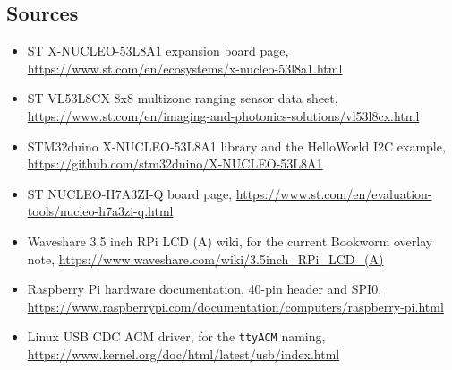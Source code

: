\subsection*{Sources}

\begin{itemize}
\item ST X-NUCLEO-53L8A1 expansion board page,
\url{https://www.st.com/en/ecosystems/x-nucleo-53l8a1.html}
\item ST VL53L8CX 8x8 multizone ranging sensor data sheet,
\url{https://www.st.com/en/imaging-and-photonics-solutions/vl53l8cx.html}
\item STM32duino X-NUCLEO-53L8A1 library and the HelloWorld I2C example,
\url{https://github.com/stm32duino/X-NUCLEO-53L8A1}
\item ST NUCLEO-H7A3ZI-Q board page,
\url{https://www.st.com/en/evaluation-tools/nucleo-h7a3zi-q.html}
\item Waveshare 3.5 inch RPi LCD (A) wiki, for the current Bookworm overlay note,
\url{https://www.waveshare.com/wiki/3.5inch_RPi_LCD_(A)}
\item Raspberry Pi hardware documentation, 40-pin header and SPI0,
\url{https://www.raspberrypi.com/documentation/computers/raspberry-pi.html}
\item Linux USB CDC ACM driver, for the \texttt{ttyACM} naming,
\url{https://www.kernel.org/doc/html/latest/usb/index.html}
\end{itemize}
